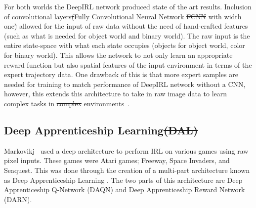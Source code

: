 \documentclass[12pt,american]{report}
\providecommand{\DIFaddtex}[1]{{\protect\color{blue}\uwave{#1}}} %
\providecommand{\DIFdeltex}[1]{{\protect\color{red}\sout{#1}}}                      %
\providecommand{\DIFaddbegin}{} %
\providecommand{\DIFaddend}{} %
\providecommand{\DIFdelbegin}{} %
\providecommand{\DIFdelend}{} %
\providecommand{\DIFadd}[1]{\texorpdfstring{\DIFaddtex{#1}}{#1}} %
\providecommand{\DIFdel}[1]{\texorpdfstring{\DIFdeltex{#1}}{}} %
\newcommand{\DIFscaledelfig}{0.5}
\newlength{\DIFdelgraphicswidth} %
\newlength{\DIFdelgraphicsheight} %
\newcommand{\DIFaddincludegraphics}[2][]{{\color{blue}\fbox{\DIFOincludegraphics[#1]{#2}}}} %
\newcommand{\DIFdelincludegraphics}[2][]{%
\sbox{\DIFdelgraphicsbox}{\DIFOincludegraphics[#1]{#2}}%
\settoboxwidth{\DIFdelgraphicswidth}{\DIFdelgraphicsbox} %
\settoboxtotalheight{\DIFdelgraphicsheight}{\DIFdelgraphicsbox} %
\scalebox{\DIFscaledelfig}{%
\parbox[b]{\DIFdelgraphicswidth}{\usebox{\DIFdelgraphicsbox}\\[-\baselineskip] \rule{\DIFdelgraphicswidth}{0em}}\llap{\resizebox{\DIFdelgraphicswidth}{\DIFdelgraphicsheight}{%
\setlength{\unitlength}{\DIFdelgraphicswidth}%
\begin{picture}(1,1)%
\thicklines\linethickness{2pt} %
{\color[rgb]{1,0,0}\put(0,0){\framebox(1,1){}}}%
{\color[rgb]{1,0,0}\put(0,0){\line( 1,1){1}}}%
{\color[rgb]{1,0,0}\put(0,1){\line(1,-1){1}}}%
\end{picture}%
}\hspace*{3pt}}} %
} %
\DeclareRobustCommand{\DIFaddbegin}{\DIFOaddbegin \let\includegraphics\DIFaddincludegraphics} %
\DeclareRobustCommand{\DIFaddend}{\DIFOaddend \let\includegraphics\DIFOincludegraphics} %
\DeclareRobustCommand{\DIFdelbegin}{\DIFOdelbegin \let\includegraphics\DIFdelincludegraphics} %
\DeclareRobustCommand{\DIFdelend}{\DIFOaddend \let\includegraphics\DIFOincludegraphics} %
\begin{document}
For both worlds the DeepIRL network produced state of the art results. Inclusion of convolutional layers\DIFdelbegin \DIFdel{(}\DIFdelend \DIFaddbegin \DIFadd{, }\DIFaddend Fully Convolutional Neural Network \DIFdelbegin %
\DIFdel{FCNN}%
\DIFdelend \DIFaddbegin \DIFadd{(FCNN) }\DIFaddend with width one\DIFdelbegin \DIFdel{) }\DIFdelend \DIFaddbegin \DIFadd{, }\DIFaddend allowed for the input of raw data without the need of hand-crafted features (such as what is needed for object world and binary world). The raw input is the entire state-space with what each state occupies (objects for object world, color for binary world). This allows the network to not only learn an appropriate reward function but also spatial features of the input environment in terms of the expert trajectory data.  One drawback of this is that more expert samples are needed for training to match performance of DeepIRL network without a CNN, however, this extends this architecture to take in raw image data to learn complex tasks in \DIFdelbegin \DIFdel{complex }\DIFdelend \DIFaddbegin \DIFadd{difficult }\DIFaddend environments~\cite{wulfmeier2015maximum}.

\subsection{Deep Apprenticeship Learning\DIFdelbegin \DIFdel{(DAL)}\DIFdelend }
\label{sec:DAL}
Markovikj~\cite{markovikj2014deep} used a deep architecture to perform IRL on various games using raw pixel inputs. These games were Atari games; Freeway, Space Invaders, and Seaquest. This was done through the creation of a multi-part architecture known as Deep Apprenticeship Learning \DIFaddbegin \DIFadd{(DAL)}\DIFaddend . The two parts of this architecture are Deep Apprenticeship Q-Network (DAQN) and Deep Apprenticeship Reward Network (DARN).
\end{document}
